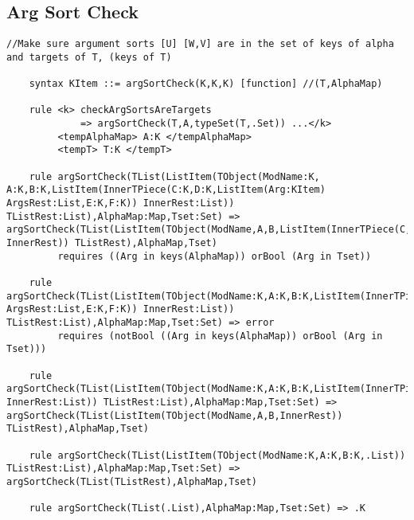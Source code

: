 \subsection{Arg Sort Check}
\begin{lstlisting}
//Make sure argument sorts [U] [W,V] are in the set of keys of alpha and targets of T, (keys of T)

    syntax KItem ::= argSortCheck(K,K,K) [function] //(T,AlphaMap)

    rule <k> checkArgSortsAreTargets
             => argSortCheck(T,A,typeSet(T,.Set)) ...</k>
         <tempAlphaMap> A:K </tempAlphaMap>
         <tempT> T:K </tempT>
    
    rule argSortCheck(TList(ListItem(TObject(ModName:K, A:K,B:K,ListItem(InnerTPiece(C:K,D:K,ListItem(Arg:KItem) ArgsRest:List,E:K,F:K)) InnerRest:List)) TListRest:List),AlphaMap:Map,Tset:Set) => argSortCheck(TList(ListItem(TObject(ModName,A,B,ListItem(InnerTPiece(C,D,ArgsRest,E,F)) InnerRest)) TListRest),AlphaMap,Tset)
         requires ((Arg in keys(AlphaMap)) orBool (Arg in Tset))

    rule argSortCheck(TList(ListItem(TObject(ModName:K,A:K,B:K,ListItem(InnerTPiece(C:K,D:K,ListItem(Arg:KItem) ArgsRest:List,E:K,F:K)) InnerRest:List)) TListRest:List),AlphaMap:Map,Tset:Set) => error
         requires (notBool ((Arg in keys(AlphaMap)) orBool (Arg in Tset)))

    rule argSortCheck(TList(ListItem(TObject(ModName:K,A:K,B:K,ListItem(InnerTPiece(C:K,D:K,.List,E:K,F:K)) InnerRest:List)) TListRest:List),AlphaMap:Map,Tset:Set) => argSortCheck(TList(ListItem(TObject(ModName,A,B,InnerRest)) TListRest),AlphaMap,Tset)

    rule argSortCheck(TList(ListItem(TObject(ModName:K,A:K,B:K,.List)) TListRest:List),AlphaMap:Map,Tset:Set) => argSortCheck(TList(TListRest),AlphaMap,Tset)

    rule argSortCheck(TList(.List),AlphaMap:Map,Tset:Set) => .K
\end{lstlisting}

